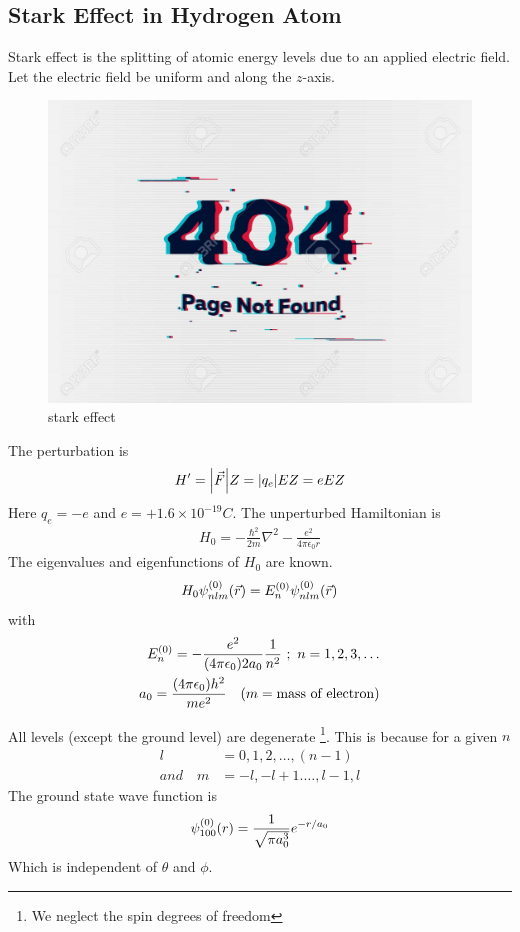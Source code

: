 	\subsection{Stark Effect in Hydrogen Atom}
	Stark effect is the splitting of atomic energy levels due to an applied electric field. Let the electric field be uniform and along the $z$-axis.
	\begin{figure}
		\centering
		\includegraphics[width=0.5\linewidth]{Pictures/not-found.jpg}
		\caption{stark effect}
	\end{figure}
	The perturbation is 
	\begin{equation}
		H^\prime = \abs{\vec{F}} Z = \abs{q_e} E Z = e E Z
	\end{equation}
	Here $q_e = - e$ and $e= + 1.6\times 10^{-19} C$. The unperturbed Hamiltonian is
	\begin{align}
		H_0 = - \frac{\hbar^2}{2 m}\nabla^2 - \frac{e^2}{4\pi \epsilon_0 r}
	\end{align}
	The eigenvalues and eigenfunctions of $H_0$ are known.
	\begin{equation}
		H_0 \psi_{n l m}^{(0)}\qty(\vec{r}) = E_n^{(0)} \psi_{n l m}^{(0)}\qty(\vec{r})
	\end{equation}
	with
	\begin{align*}
		E_n^{(0)} = - \frac{e^2}{\qty(4 \pi \epsilon_0) 2 a_0} \frac{1}{n^2} \ ; \ n = 1,2,3, \ldots \\
		a_0 = \frac{\qty(4 \pi \epsilon_0) h^2}{m e^2} \quad \qty(m=\text{mass of electron})
	\end{align*}
	
	All levels (except the ground level) are degenerate \footnote{We neglect the spin degrees of freedom}. This is because for a given $n$
	\begin{align*}
		l &= 0,1,2,\ldots,(n-1) \\
		and\quad m &= -l,-l+1. \ldots, l-1, l
	\end{align*}
	The ground state wave function is 
	\begin{equation*}
		\psi_{1 0 0}^{(0)}\qty(r) = \frac{1}{\sqrt{\pi a_0^3}} e^{-r / a_0}
	\end{equation*}
	Which is independent of $\theta$ and $\phi$.\\
	
